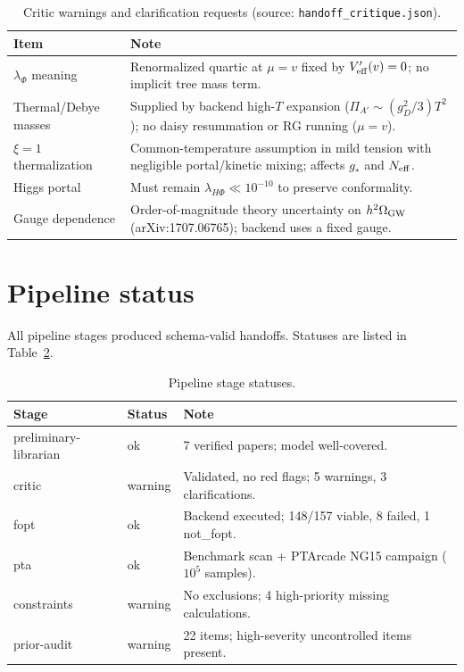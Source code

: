\documentclass[11pt]{article}
\newcommand{\Ombg}{h^2\Omega_{\rm GW}}
\newcommand{\gD}{g_D}
\begin{document}
\begin{table}[ht]
\centering\small
\caption{Critic warnings and clarification requests (source:
\texttt{handoff\_critique.json}).}
\label{tab:critic}
\begin{tabular}{p{} p{}}
\toprule
Item & Note \\
\midrule
$\lambda_\Phi$ meaning & Renormalized quartic at $\mu=v$ fixed by
$V_{\rm eff}'(v)=0$; no implicit tree mass term. \\
Thermal/Debye masses & Supplied by backend high-$T$ expansion
($\Pi_{A'}\sim(\gD^2/3)T^2$); no daisy resummation or RG running ($\mu=v$). \\
$\xi=1$ thermalization & Common-temperature assumption in mild tension with
negligible portal/kinetic mixing; affects $g_*$ and $N_{\rm eff}$. \\
Higgs portal & Must remain $\lambda_{H\Phi}\ll10^{-10}$ to preserve conformality. \\
Gauge dependence & Order-of-magnitude theory uncertainty on $\Ombg$
(arXiv:1707.06765); backend uses a fixed gauge. \\
\bottomrule
\end{tabular}
\end{table}

\section{Pipeline status}
\label{sec:status}
All pipeline stages produced schema-valid handoffs. Statuses are listed in
Table~\ref{tab:status}.

\begin{table}[ht]
\centering\small
\caption{Pipeline stage statuses.}
\label{tab:status}
\begin{tabular}{l l p{}}
\toprule
Stage & Status & Note \\
\midrule
preliminary-librarian & ok & 7 verified papers; model well-covered. \\
critic & warning & Validated, no red flags; 5 warnings, 3 clarifications. \\
fopt & ok & Backend executed; 148/157 viable, 8 failed, 1 not\_fopt. \\
pta & ok & Benchmark scan + PTArcade NG15 campaign ($10^5$ samples). \\
constraints & warning & No exclusions; 4 high-priority missing calculations. \\
prior-audit & warning & 22 items; high-severity uncontrolled items present. \\
\bottomrule
\end{tabular}
\end{table}
\end{document}
